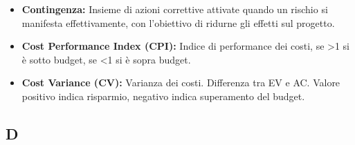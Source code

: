 \begin{itemize}[leftmargin=*]
      \item \textbf{Contingenza:} Insieme di azioni correttive attivate quando un rischio si manifesta effettivamente, con l'obiettivo di ridurne gli effetti sul progetto.
      \item \textbf{Cost Performance Index (CPI):} Indice di performance dei costi, se >1 
      si è sotto budget, se <1 si è sopra budget.
      \item \textbf{Cost Variance (CV):} Varianza dei costi. 
      Differenza tra EV e AC. Valore positivo indica risparmio, 
      negativo indica superamento del budget.
\end{itemize}
 
{}
\subsection*{D}
